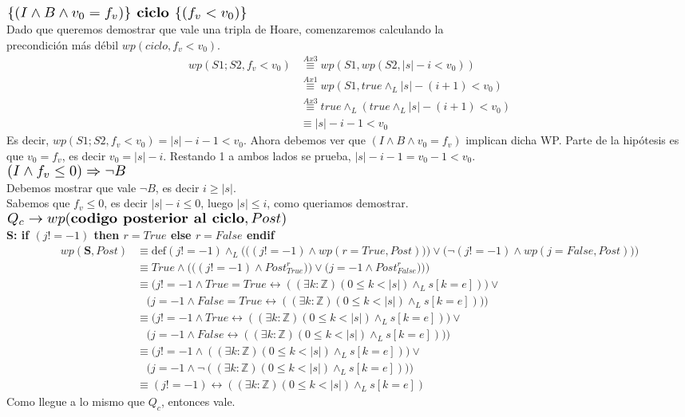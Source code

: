 \documentclass[a4paper]{article}
\begin{document}
	$\scalebox{1.3}{$\{(I\wedge B\wedge v_0=f_v)\}\textbf{ ciclo }\{(f_v<v_0)\}$}$\medskip \\
	Dado que queremos demostrar que vale una tripla de Hoare, comenzaremos calculando la\\ precondición más débil $wp(ciclo,f_v<v_0)$.
	\begin{align*}
		wp(S1;S2,f_v<v_0)&\stackrel{Ax3}{\equiv}wp(S1,wp(S2,|s|-i<v_0))\\
			&\stackrel{Ax1}{\equiv}wp(S1,true\wedge_L |s|-(i+1)<v_0)\\
			&\stackrel{Ax3}{\equiv}true\wedge_L(true\wedge_L  |s|-(i+1)<v_0)\\
			&\equiv |s|-i-1<v_0
	\end{align*}
	Es decir, $wp(S1;S2,f_v<v_0)=|s|-i-1<v_0$. Ahora debemos ver que $(I\wedge B\wedge v_0=f_v)$ implican dicha WP. Parte de la 
	hipótesis es que $v_0=f_v$, es decir $v_0=|s|-i$. Restando 1 a ambos lados se prueba, $|s|-i-1=v_0-1<v_0$.\medskip \\
	$\scalebox{1.3}{$(I\wedge f_v\leq 0)\Rightarrow \neg B$}$\medskip\\
	Debemos mostrar que vale $\neg B$, es decir $i\geq |s|$.\\
	Sabemos que $f_v\leq 0$, es decir $|s|-i\leq 0$, luego $|s|\leq i$, como queriamos demostrar.\medskip\\
	\noindent
$\scalebox{1.3}{$Q_c \rightarrow wp(\textbf{codigo posterior al ciclo},Post)$}$\medskip \\
\textbf{S: if $(j != -1)$ then $r=True$ else $r=False$ endif}\\
\begin{align*}
   			wp(\textbf{S},Post)&\equiv \textrm{def}(j != -1)\wedge_L 
   				\Bigg(\Big((j!=-1)\wedge wp(r=True,Post))\Big) \vee\Big(\neg (j!=-1)\wedge wp(j=False,Post)\Big)\Bigg)\\
   					&\equiv True \wedge \Bigg(\Big((j!=-1)\wedge Post_{True}^{r})\Big) 
   						\vee\Big(j=-1\wedge Post_{False}^{r})\Big)\Bigg)\\ 
   				&\equiv \Big(j!=-1\wedge True=True \leftrightarrow ((\exists k:\mathbb{Z})(0\leq k<|s|)\wedge_L s[k=e])\Big) \vee\\
   						&\ \ \ \ \Big(j=-1\wedge False=True \leftrightarrow ((\exists k:\mathbb{Z})(0\leq k<|s|)\wedge_L s[k=e]))\Big)\\ 
   				&\equiv \Big(j!=-1\wedge True \leftrightarrow ((\exists k:\mathbb{Z})(0\leq k<|s|)\wedge_L s[k=e])\Big) \vee\\
   						&\ \ \ \ \Big(j=-1\wedge False \leftrightarrow ((\exists k:\mathbb{Z})(0\leq k<|s|)\wedge_L s[k=e]))\Big)\\   
   				&\equiv \Big(j!=-1\wedge ((\exists k:\mathbb{Z})(0\leq k<|s|)\wedge_L s[k=e])\Big) \vee\\
   						&\ \ \ \ \Big(j=-1\wedge \neg((\exists k:\mathbb{Z})(0\leq k<|s|)\wedge_L s[k=e]))\Big)\\    	
   				&\equiv (j!=-1)\leftrightarrow ((\exists k:\mathbb{Z})(0\leq k<|s|)\wedge_L s[k=e])  						   				  		
   		\end{align*}
Como llegue  a lo mismo que $Q_c$, entonces vale.
\end{document}
